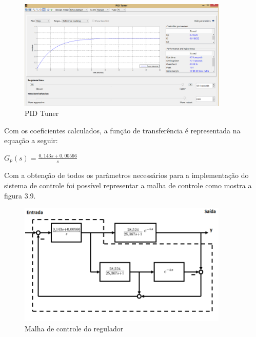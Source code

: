 \begin{figure}[H]

\center

\includegraphics[width=10cm]{imagens/PID_TUNER.png}

\label{PID Tuner}

\caption{PID Tuner}
\end{figure}

Com os coeficientes calculados, a função de transferência é representada na equação a seguir:

\begin{center}

$G_p(s) = \frac{0,143 s + 0,00566}{s}$
\end{center}

    Com a obtenção de todos os parâmetros necessários para a implementação do sistema de controle foi possível representar a malha de controle como mostra a figura 3.9.
    
\begin{figure}[H]

\center

\includegraphics[width=10cm]{imagens/preditor_smith_chuveiro.png}

\label{Malha de controle do regulador}

\caption{Malha de controle do regulador}
\end{figure}
    
    

